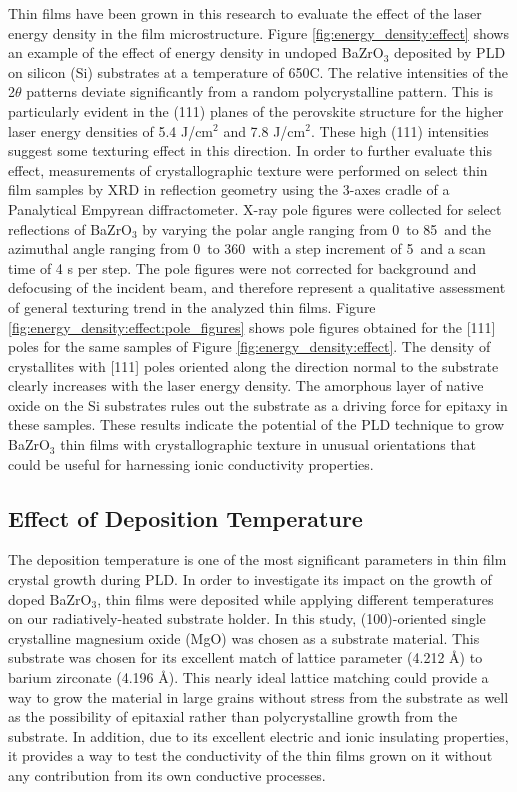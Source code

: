 Thin films have been grown in this research to evaluate the effect of the laser energy density in the film microstructure. Figure \ref{fig:energy_density:effect} shows an example of the effect of energy density in undoped BaZrO$_3$ deposited by PLD on silicon (Si) substrates at a temperature of 650\textdegree C. The relative intensities of the 2$\theta$ patterns deviate significantly from a random polycrystalline pattern. This is particularly evident in the (111) planes of the perovskite structure for the higher laser energy densities of 5.4 J/cm$^2$ and 7.8 J/cm$^2$. These high (111) intensities suggest some texturing effect in this direction. In order to further evaluate this effect, measurements of crystallographic texture were performed on select thin film samples by XRD in reflection geometry using the 3-axes cradle of a Panalytical Empyrean diffractometer. X-ray pole figures were collected for select reflections of BaZrO$_3$ by varying the polar angle ranging from 0\textdegree\ to 85\textdegree\ and the azimuthal angle ranging from 0\textdegree\ to 360\textdegree\ with a step increment of 5\textdegree\ and a scan time of 4 s per step. The pole figures were not corrected for background and defocusing of the incident beam, and therefore represent a qualitative assessment of general texturing trend in the analyzed thin films. Figure \ref{fig:energy_density:effect:pole_figures} shows pole figures obtained for the [111] poles for the same samples of Figure \ref{fig:energy_density:effect}. 
The density of crystallites with [111] poles oriented along the direction normal to the substrate clearly increases with the laser energy density. The amorphous layer of native oxide on the Si substrates rules out the substrate as a driving force for epitaxy in these samples. These results indicate the potential of the PLD technique to grow BaZrO$_3$ thin films with crystallographic texture in unusual orientations that could be useful for harnessing ionic conductivity properties.  

\vspace{12pt}
\subsection{Effect of Deposition Temperature}
\label{sec:film:xrd:epitaxy}
The deposition temperature is one of the most significant parameters in thin film crystal growth during PLD. In order to investigate its impact on the growth of doped BaZrO$_3$, thin films were deposited while applying different temperatures on our radiatively-heated substrate holder. In this study, (100)-oriented single crystalline magnesium oxide (MgO) was chosen as a substrate material. This substrate was chosen for its excellent match of lattice parameter (4.212 \AA) to barium zirconate (4.196 \AA). This nearly ideal lattice matching could provide a way to grow the material in large grains without stress from the substrate as well as the possibility of epitaxial rather than polycrystalline growth from the substrate. In addition, due to its excellent electric and ionic insulating properties, it provides a way to test the conductivity of the thin films grown on it without any contribution from its own conductive processes.

